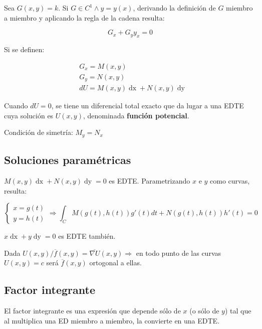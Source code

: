 \documentclass{article}
\begin{document}
Sea $G(x,y) = k$. Si $G \in C^1 \wedge y = y(x)$, derivando la definición de $G$ miembro a miembro y aplicando la regla de la cadena resulta:

\begin{equation}
G_x + G_y y_x = 0
\end{equation}

Si se definen:

\begin{subequations}
\begin{align}
& G_x = M(x,y) \\
& G_y = N(x,y) \\
& dU = M(x,y) \mathop{dx} + N(x,y) \mathop{dy}
\end{align}
\end{subequations}

Cuando $dU = 0$, se tiene un diferencial total exacto que da lugar a una EDTE cuya solución es $U(x,y)$, denominada \textbf{función potencial}.

Condición de simetría: $M_y = N_x$

\subsection{Soluciones paramétricas}

$M(x,y) \mathop{dx} + N(x,y) \mathop{dy} = 0$ es EDTE. Parametrizando $x$ e $y$ como curvas, resulta:

\begin{equation}
\left\{
\begin{array}{ll}
x = g(t) \\
y = h(t)
\end{array}
\right. \Rightarrow \int_C M(g(t), h(t)) g'(t) dt + N(g(t), h(t)) h'(t) = 0
\end{equation}

$x \mathop{dx} + y \mathop{dy} = 0$ es EDTE también.

Dada $U(x,y) / \overline{f}(x,y) = \overline{\nabla U}(x,y) \Rightarrow$ en todo punto de las curvas $U(x,y) = c$ será $\overline{f}(x,y)$ ortogonal a ellas.

\subsection{Factor integrante}

El factor integrante es una expresión que depende sólo de $x$ (o sólo de $y$) tal que al multiplica una ED miembro a miembro, la convierte en una EDTE.
\end{document}
